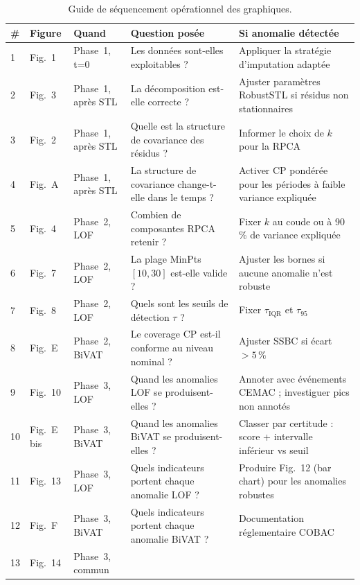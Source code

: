 \documentclass[12pt,a4paper]{article}
\begin{document}
\begin{table}[ht]
\centering
\caption{Guide de séquencement opérationnel des graphiques.}
\label{tab:sequencement}
\small
\begin{tabular}{p{0.5cm}p{1.8cm}p{2cm}p{4cm}p{5cm}}
\toprule
\textbf{\#} & \textbf{Figure} & \textbf{Quand} &
\textbf{Question posée} & \textbf{Si anomalie détectée} \\
\midrule
1 & Fig.~1 & Phase~1, t=0 &
Les données sont-elles exploitables ? &
Appliquer la stratégie d'imputation adaptée \\
\midrule
2 & Fig.~3 & Phase~1, après STL &
La décomposition est-elle correcte ? &
Ajuster paramètres RobustSTL si résidus non stationnaires \\
\midrule
3 & Fig.~2 & Phase~1, après STL &
Quelle est la structure de covariance des résidus ? &
Informer le choix de $k$ pour la RPCA \\
\midrule
4 & Fig.~A & Phase~1, après STL &
La structure de covariance change-t-elle dans le temps ? &
Activer CP pondérée pour les périodes à faible variance expliquée \\
\midrule
5 & Fig.~4 & Phase~2, LOF &
Combien de composantes RPCA retenir ? &
Fixer $k$ au coude ou à 90\,\% de variance expliquée \\
\midrule
6 & Fig.~7 & Phase~2, LOF &
La plage MinPts $[10,30]$ est-elle valide ? &
Ajuster les bornes si aucune anomalie n'est robuste \\
\midrule
7 & Fig.~8 & Phase~2, LOF &
Quels sont les seuils de détection $\tau$ ? &
Fixer $\tau_{\mathrm{IQR}}$ et $\tau_{95}$ \\
\midrule
8 & Fig.~E & Phase~2, BiVAT &
Le coverage CP est-il conforme au niveau nominal ? &
Ajuster SSBC si écart $>5\,\%$ \\
\midrule
9 & Fig.~10 & Phase~3, LOF &
Quand les anomalies LOF se produisent-elles ? &
Annoter avec événements CEMAC ; investiguer pics non annotés \\
\midrule
10 & Fig.~E bis & Phase~3, BiVAT &
Quand les anomalies BiVAT se produisent-elles ? &
Classer par certitude : score + intervalle inférieur vs seuil \\
\midrule
11 & Fig.~13 & Phase~3, LOF &
Quels indicateurs portent chaque anomalie LOF ? &
Produire Fig.~12 (bar chart) pour les anomalies robustes \\
\midrule
12 & Fig.~F & Phase~3, BiVAT &
Quels indicateurs portent chaque anomalie BiVAT ? &
Documentation réglementaire COBAC \\
\midrule
13 & Fig.~14 & Phase~3, commun &

\end{tabular}
\end{table}
\end{document}
